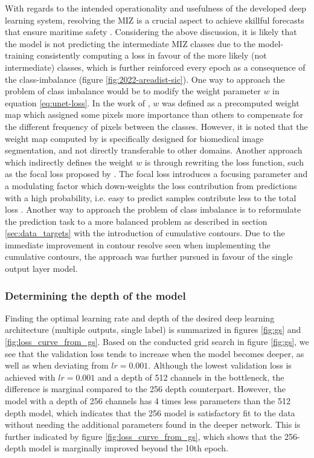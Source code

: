 \documentclass[../main/thesis]{subfiles}
\begin{document}
With regards to the intended operationality and usefulness of the developed deep learning system, resolving the MIZ is a crucial aspect to achieve skillful forecasts that ensure maritime safety \citep{Wagner2020}. Considering the above discussion, it is likely that the model is not predicting the intermediate MIZ classes due to the model-training consistently computing a loss in favour of the more likely (not intermediate) classes, which is further reinforced every epoch as a consequence of the class-imbalance (figure \ref{fig:2022-areadist-sic}). One way to approach the problem of class imbalance would be to modify the weight parameter $w$ in equation \ref{eq:unet-loss}. In the work of \citet{Ronneberger2015}, $w$ was defined as a precomputed weight map which assigned some pixels more importance than others to compensate for the different frequency of pixels between the classes. However, it is noted that the weight map computed by \citet{Ronneberger2015} is specifically designed for biomedical image segmentation, and not directly transferable to other domains. Another approach which indirectly defines the weight $w$ is through rewriting the loss function, such as the focal loss proposed by \citet{Lin2017}. The focal loss introduces a focusing parameter and a modulating factor which down-weights the loss contribution from predictions with a high probability, i.e. easy to predict samples contribute less to the total loss \citep{Lin2017}. Another way to approach the problem of class imbalance is to reformulate the prediction task to a more balanced problem as described in section \ref{sec:data_targets} with the introduction of cumulative contours. Due to the immediate improvement in contour resolve seen when implementing the cumulative contours, the approach was further pursued in favour of the single output layer model.

\subsubsection{Determining the depth of the model}
\label{sec:discuss_depth}
Finding the optimal learning rate and depth of the desired deep learning architecture (multiple outputs, single label) is summarized in figures \ref{fig:gs} and \ref{fig:loss_curve_from_gs}. Based on the conducted grid search in figure \ref{fig:gs}, we see that the validation loss tends to increase when the model becomes deeper, as well as when deviating from $lr = 0.001$. Although the lowest validation loss is achieved with $lr = 0.001$ and a depth of 512 channels in the bottleneck, the difference is marginal compared to the 256 depth counterpart. However, the model with a depth of 256 channels has 4 times less parameters than the 512 depth model, which indicates that the 256 model is satisfactory fit to the data without needing the additional parameters found in the deeper network. This is further indicated by figure \ref{fig:loss_curve_from_gs}, which shows that the 256-depth model is marginally improved beyond the 10th epoch. 
\end{document}
